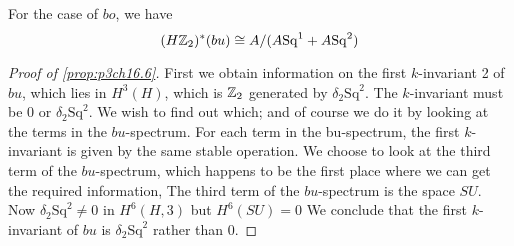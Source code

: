 \documentclass[../main]{subfiles}
\begin{document}
    For the case of $bo$, we have $$
        (H\mathbb{Z}_2)^{\ast}(bu) \cong A/(A\mathrm{Sq}^{1}+A\mathrm{Sq}^{2})
    $$
    \begin{proof}[Proof of \ref{prop:p3ch16.6}]
     First we obtain information on the first $k$-invariant
2 of $bu$, which lies in $H^{3}(H)$, which is $\mathbb{Z}_2$ generated by $
\delta_{2}\mathrm{Sq}^{2}$. The $k$-invariant must be 0 or $\delta_{2}\mathrm{Sq}^{2}$. We wish to find out which; and of course we do it by looking at the terms in the $bu$-spectrum. For each term in the bu-spectrum, the first $k$-invariant is given by the same stable operation. We choose to look at the third term of the $bu$-spectrum, which happens to be the first place where we can get the required information, The third term of the $bu$-spectrum is the space $SU$. Now $\delta_{2}\mathrm{Sq}^{2}\neq 0$ in $H^{6}(H,3)$ but $H^{6}(SU)=0$ We conclude that the first $k$-invariant of $bu$ is  $\delta_{2}\mathrm{Sq}^{2}$ rather than 0. 


\end{proof}
\end{document}
